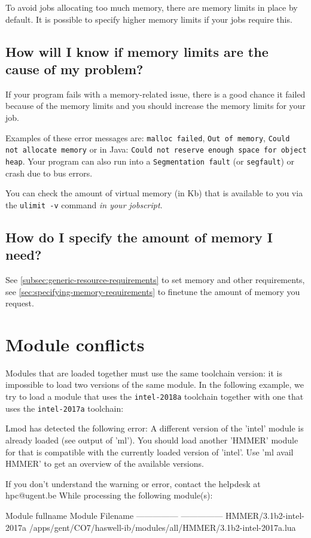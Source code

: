 To avoid jobs allocating too much memory, there are memory limits in place by default.
It is possible to specify higher memory limits if your jobs require this.

\subsection{How will I know if memory limits are the cause of my problem?}

If your program fails with a memory-related issue, there is a good chance it failed
because of the memory limits and you should increase the memory limits for your job.

Examples of these error messages are: \verb|malloc failed|, \verb|Out of memory|,
\verb|Could not allocate memory|
or in Java: \verb|Could not reserve enough space for object heap|. Your program can
also run into a \verb|Segmentation fault| (or \verb|segfault|) or crash due to bus errors.

You can check the amount of virtual memory (in Kb) that is available to you via the
\verb|ulimit -v| command \emph{in your jobscript}.

\subsection{How do I specify the amount of memory I need?}

See \autoref{subsec:generic-resource-requirements} to set memory and other requirements,
see \autoref{sec:specifying-memory-requirements} to finetune the amount of memory you request.

\ifgent

\section{Module conflicts}

Modules that are loaded together must use the same toolchain version:
it is impossible to load two versions of the same module. In the following
example, we try to load a module that uses the \verb|intel-2018a| toolchain
together with one that uses the \verb|intel-2017a| toolchain:

\begin{prompt}
Lmod has detected the following error:  A different version of the 'intel' module is already loaded (see output of 'ml').
You should load another 'HMMER' module for that is compatible with the currently loaded version of 'intel'.
Use 'ml avail HMMER' to get an overview of the available versions.

If you don't understand the warning or error, contact the helpdesk at hpc@ugent.be
While processing the following module(s):

    Module fullname          Module Filename
    ---------------          ---------------
    HMMER/3.1b2-intel-2017a  /apps/gent/CO7/haswell-ib/modules/all/HMMER/3.1b2-intel-2017a.lua
\end{prompt}


